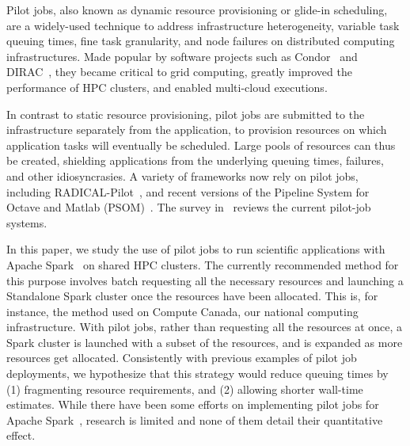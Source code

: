     Pilot jobs, also known as dynamic resource provisioning or glide-in
    scheduling, are a widely-used technique to address infrastructure
    heterogeneity, variable task queuing times, fine task granularity, and node
    failures on distributed computing infrastructures. Made popular by software
    projects such as Condor~\cite{thain2005distributed} and
    DIRAC~\cite{casajus2010dirac}, they became critical to grid computing,
    greatly improved the performance of HPC clusters, and enabled multi-cloud
    executions. 
    
    In contrast to static resource provisioning, pilot jobs are submitted to the
    infrastructure separately from the application, to provision resources on
    which application tasks will eventually be scheduled. Large pools of
    resources can thus be created, shielding applications from the underlying
    queuing times, failures, and other idiosyncrasies. A variety of frameworks
    now rely on pilot jobs, including RADICAL-Pilot~\cite{merzky2015radical},
    and recent versions of the Pipeline System for Octave and Matlab
    (PSOM)~\cite{bellec2012pipeline}. The survey
    in~\cite{turilli2018comprehensive} reviews the current pilot-job systems.
    
    In this paper, we study the use of pilot jobs to run scientific applications
    with Apache Spark~\cite{zaharia2016apache} on shared HPC clusters. The
    currently recommended method for this purpose involves batch requesting all
    the necessary resources and launching a Standalone Spark cluster once the
    resources have been allocated. This is, for instance, the method used on
    Compute Canada, our national computing infrastructure. With pilot jobs,
    rather than requesting all the resources at once, a Spark cluster is
    launched with a subset of the resources, and is expanded as more resources
    get allocated. Consistently with previous examples of pilot job deployments,
    we hypothesize that this strategy would reduce queuing times by (1)
    fragmenting resource requirements, and (2) allowing shorter wall-time
    estimates. While there have been some efforts on implementing pilot jobs for
    Apache Spark~\cite{luckow2016hadoop}, research is limited and none of them
    detail their quantitative effect.
    
